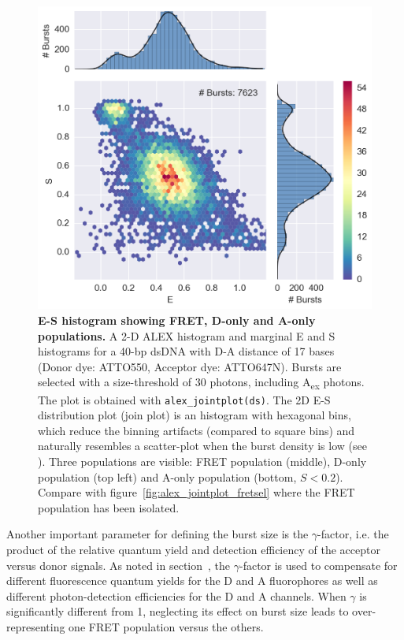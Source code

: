 \documentclass[10pt,letterpaper]{article}
\begin{document}
\begin{figure}[h!]
\begin{center}
\includegraphics[width=0.7\columnwidth]{figures/alex_jointplot/alex_jointplot}
\caption{\label{fig:alex_jointplot} \textbf{E-S histogram showing FRET, D-only and A-only populations.}
A 2-D ALEX histogram and marginal E and S histograms for a 40-bp dsDNA
with D-A distance of 17 bases (Donor dye: ATTO550, Acceptor dye: ATTO647N).
Bursts are selected with a size-threshold of 30 photons, including A\textsubscript{ex} photons.
The plot is obtained with \texttt{alex\_jointplot(ds)}. The 2D E-S distribution plot (join plot)
is an histogram with hexagonal bins, which reduce the binning artifacts (compared to square bins)
and naturally resembles a scatter-plot when the burst density is low
(see ).
Three populations are visible: FRET population (middle), D-only population (top left) and
A-only population (bottom, $S < 0.2$). Compare with figure~\ref{fig:alex_jointplot_fretsel}
where the FRET population has been isolated.%
}
\end{center}
\end{figure}


Another important parameter for defining the burst size is the $\gamma$-factor, i.e. the product of the relative quantum yield and detection efficiency of the acceptor versus donor signals. As noted in
section~, the $\gamma$-factor is
used to compensate for different fluorescence quantum yields for the D and A
fluorophores as well as different photon-detection efficiencies for the D and A channels.
When $\gamma$ is significantly different from 1, neglecting its effect on burst size leads to
over-representing one FRET population versus the others.
\end{document}

